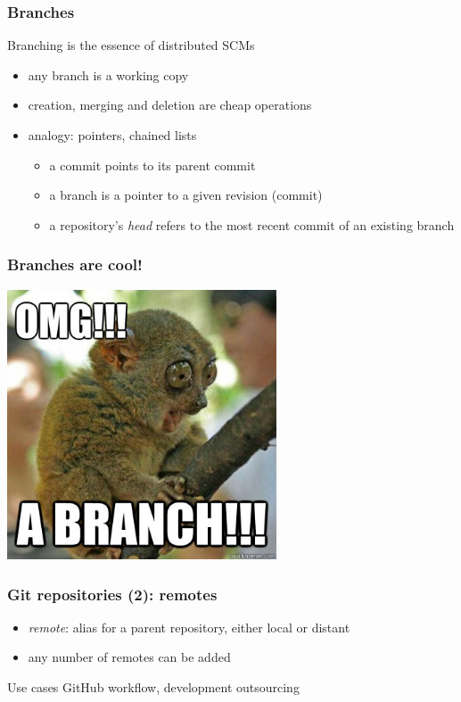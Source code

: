 \begin{frame}
  \frametitle{Branches}

  Branching is the essence of distributed SCMs
  \begin{itemize}
    \item any branch is a working copy
    \item creation, merging and deletion are cheap operations
    \item analogy: pointers, chained lists
      \begin{itemize}
        \item a commit points to its parent commit
        \item a branch is a pointer to a given revision (commit)
        \item a repository's \textit{head} refers to the most recent
          commit of an existing branch
      \end{itemize}
  \end{itemize}
\end{frame}

\begin{frame}
  \frametitle{Branches are cool!}
  \begin{center}
    \includegraphics[width=0.6\textwidth]{img/omgabranch.jpg}
  \end{center}
\end{frame}

\begin{frame}
  \frametitle{Git repositories (2): remotes}

  \begin{itemize}
    \item \textit{remote}: alias for a parent repository,
      either local or distant
    \item any number of remotes can be added
  \end{itemize}
  \begin{block}{Use cases}
    GitHub workflow, development outsourcing
  \end{block}
\end{frame}

